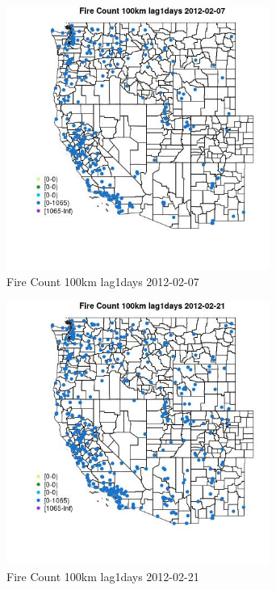\begin{figure} 
\centering  
\includegraphics[width=0.77\textwidth]{Code_Outputs/Report_ML_input_PM25_Step4_part_f_de_duplicated_aves_prioritize_24hr_obswNAs_MapObsFire_Count_100km_lag1days2012-02-07.jpg} 
\caption{\label{fig:Report_ML_input_PM25_Step4_part_f_de_duplicated_aves_prioritize_24hr_obswNAsMapObsFire_Count_100km_lag1days2012-02-07}Fire Count 100km lag1days 2012-02-07} 
\end{figure} 
 

\begin{figure} 
\centering  
\includegraphics[width=0.77\textwidth]{Code_Outputs/Report_ML_input_PM25_Step4_part_f_de_duplicated_aves_prioritize_24hr_obswNAs_MapObsFire_Count_100km_lag1days2012-02-21.jpg} 
\caption{\label{fig:Report_ML_input_PM25_Step4_part_f_de_duplicated_aves_prioritize_24hr_obswNAsMapObsFire_Count_100km_lag1days2012-02-21}Fire Count 100km lag1days 2012-02-21} 
\end{figure} 
 

